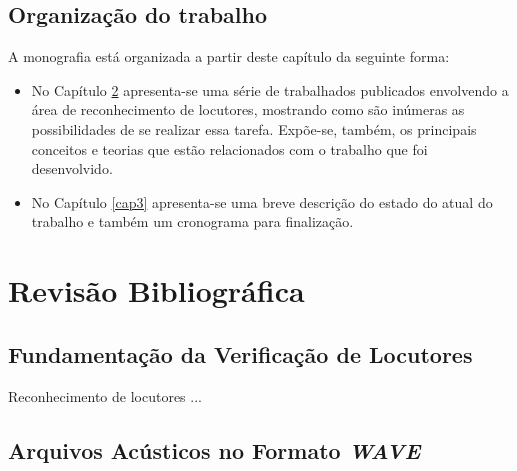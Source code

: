 \documentclass[a4paper,12pt,twoside,openright]{report}
\begin{document}
\section{Organiza\c{c}\~{a}o do trabalho}
\par A monografia est\'{a} organizada a partir deste cap\'{i}tulo da seguinte forma:

\begin{itemize}
\item{}No Cap\'{i}tulo \ref{cap2} apresenta-se uma s\'{e}rie de trabalhados publicados envolvendo a \'{a}rea de reconhecimento de locutores, mostrando como s\~{a}o in\'{u}meras as possibilidades de se realizar essa tarefa. Exp\~{o}e-se, tamb\'{e}m, os principais conceitos e teorias que est\~{a}o relacionados com o trabalho que foi desenvolvido.
\end{itemize}

\begin{itemize}
	\item{}No Cap\'{i}tulo \ref{cap3} apresenta-se uma breve descri{\c c}\~{a}o do estado do atual do trabalho e tamb\'{e}m um cronograma para finaliza{\c c}\~{a}o.
\end{itemize}
\chapter{Revis\~{a}o Bibliogr\'{a}fica}
\label{cap2}
\thispagestyle{myheadings}
\section{Fundamenta\c{c}\~{a}o da Verifica\c{c}\~{a}o de Locutores}
\label{secao_reconhecimento}
\par Reconhecimento de locutores \cite{BEIGI2011}...
\section{Arquivos Ac\'{u}sticos no Formato \textit{WAVE}}
\label{secao_formato wave}
\end{document}
